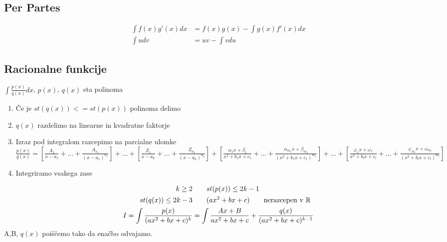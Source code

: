 \documentclass[a4paper,oneside,8pt]{extarticle}
\theoremstyle{definition}
\newcommand{\R}{\ensuremath{\mathbb{R}}}
\renewcommand{\phi}{\varphi}
\newcommand\ogl[1]{\left[#1\right]}
\begin{document}
\begin{multicols}{2}
	\subsection*{Per Partes}
	\begin{align*}
		\int f(x)g'(x)dx &= f(x)g(x) - \int g(x)f'(x)dx\\
		\int udv &= uv - \int vdu
	\end{align*}
%
	\subsection*{Racionalne funkcije}
	$\int\frac{p(x)}{q(x)}dx$, \qquad $p(x)$, $q(x)$ sta polinoma
	\begin{enumerate}
		\item Če je $st(q(x)) <= st(p(x))$ polinoma delimo
		\item $q(x)$ razdelimo na linearne in kvadratne faktorje
		\item Izraz pod integralom razcepimo na parcialne ulomke\\
		$\frac{p(x)}{q(x)} = \ogl{\frac{A_1}{x-a_1} + \dots + \frac{A_{n_1}}{(x-a_1)^{{n_1}}} } + \dots +
		\ogl{\frac{Z_1}{x-a_k}+ \dots + \frac{Z_{n_k}}{(x-a_k)^{{n_k}}} } + 
		\ogl{\frac{\alpha_1x + \beta_1}{x^2 + b_1x + c_1} + \dots + \frac{\alpha_{m_1}x + \beta_{m_1}}{(x^2 + b_1x +c_1)^{m_1}} } + \dots + 
		\ogl{\frac{\phi_1x + \omega_1}{x^2 + b_lx + c_l} + \dots + \frac{\phi_{m_l}x + \omega_{m_l}}{(x^2 + b_lx +c_l)^{m_l}} }$
		\item Integriramo vsakega zase
	\end{enumerate}
%	
	\begin{align*}
		k \geq 2 & \qquad st(p(x)) \leq 2k - 1\\
		st(q(x)) \leq 2k - 3 & \qquad (ax^2 + bx + c) \qquad \text{nerazcepen v \R}\\
		I = \int \frac{p(x)}{(ax^2 + bx + c)^k} &= \int \frac{Ax+B}{ax^2 + bx + c} + \frac{q(x)}{(ax^2 + bx + c)^{k-1}}
	\end{align*}
	A,B, $q(x)$ poiščemo tako da enačbo odvajamo.
%

\end{multicols}
\end{document}
